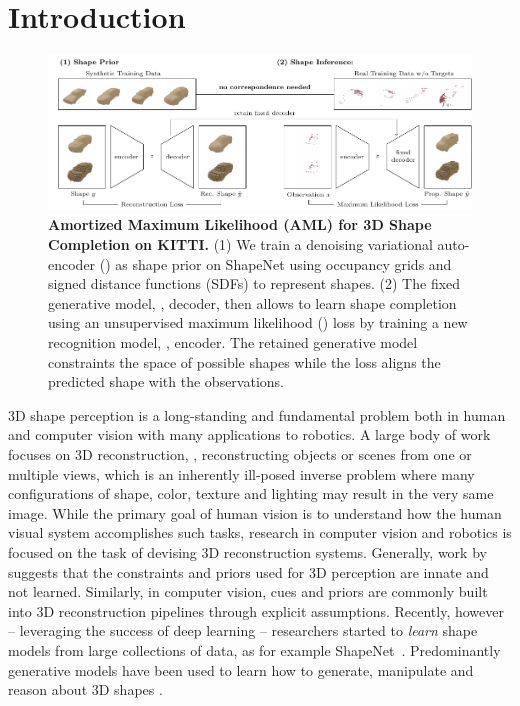 \section{Introduction}
\label{sec:introduction}


\begin{figure}
    \vspace*{-\figskipabove px}
    \vspace*{\figskipabove px}
    \centering
    \includegraphics[width=1\linewidth]{fig_method}
    \vspace*{-12px}
    \caption{{{\bf Amortized Maximum Likelihood (AML) for 3D Shape Completion on KITTI.}
            (1) We train a denoising variational auto-encoder (\DVAE) \citep{Kingma2014ICLR,Im2017AAAI} as shape prior on ShapeNet using occupancy grids and signed distance functions (SDFs) to represent shapes. (2) The fixed generative model, \ie, decoder, then allows to learn shape completion using an unsupervised maximum likelihood (\ML) loss by training a new recognition model, \ie, encoder. The retained generative model constraints the space of possible shapes while the \ML loss aligns the predicted shape with the observations.}}
    \label{fig:method}
    \vspace*{-\figskipbelow px}
    \vspace*{\figskipbelow px}
\end{figure}

3D shape perception is a long-standing and fundamental problem both in human and computer vision \citep{Pizlo2007CAIP,Pizlo2010,Furukawa2013FTCGV} with many applications to robotics. A large body of work focuses on 3D reconstruction, \eg, reconstructing objects or scenes from one or multiple views, which is an inherently ill-posed inverse problem where many configurations of shape, color, texture and lighting may result in the very same image. While the primary goal of human vision is to understand how the human visual system accomplishes such tasks, research in computer vision and robotics is focused on the task of devising 3D reconstruction systems. Generally, work by \cite{Pizlo2010} suggests that the constraints and priors used for 3D perception are innate and not learned. Similarly, in computer vision, cues and priors are commonly built into 3D reconstruction pipelines through explicit assumptions. Recently, however -- leveraging the success of deep learning -- researchers started to \emph{learn} shape models from large collections of data, as for example ShapeNet~\citep{Chang2015ARXIV}. Predominantly generative models have been used to learn how to generate, manipulate and reason about 3D shapes  \citep{Girdhar2016ECCV,Brock2016ARXIV,Sharma2016ARXIV,Wu2016NIPS,Wu2015CVPR}.

